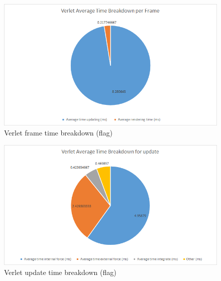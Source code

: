     \begin{figure}
    \begin{center}
      \includegraphics[scale=.9]{Figures/flag_v_ft}
    \end{center}
    \caption{Verlet frame time breakdown (flag)}
    \label{fig:v ft flag}
  \end{figure}
  
    \begin{figure}
    \begin{center}
      \includegraphics[scale=.9]{Figures/flag_v_ut}
    \end{center}
    \caption{Verlet update time breakdown (flag)}
    \label{fig:v ut flag}
  \end{figure}

